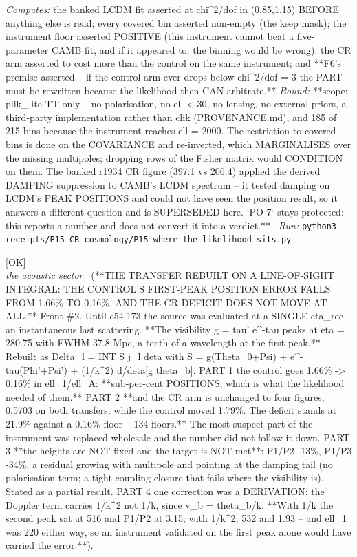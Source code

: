 \begin{description}
\emph{Computes:} the banked LCDM fit asserted at chi\textasciicircum{}2/dof in (0.85,1.15) BEFORE anything else is read; every covered bin asserted non-empty (the keep mask); the instrument floor asserted POSITIVE (this instrument cannot beat a five-parameter CAMB fit, and if it appeared to, the binning would be wrong); the CR arm asserted to cost more than the control on the same instrument; and **F6's premise asserted -- if the control arm ever drops below chi\textasciicircum{}2/dof = 3 the PART must be rewritten because the likelihood then CAN arbitrate.**
 \emph{Bound:} **scope: plik\_lite TT only -- no polarisation, no ell < 30, no lensing, no external priors, a third-party implementation rather than clik (PROVENANCE.md), and 185 of 215 bins because the instrument reaches ell = 2000. The restriction to covered bins is done on the COVARIANCE and re-inverted, which MARGINALISES over the missing multipoles; dropping rows of the Fisher matrix would CONDITION on them. The banked r1934 CR figure (397.1 vs 206.4) applied the derived DAMPING suppression to CAMB's LCDM spectrum -- it tested damping on LCDM's PEAK POSITIONS and could not have seen the position result, so it answers a different question and is SUPERSEDED here. `PO-7` stays protected: this reports a number and does not convert it into a verdict.**
\ \emph{Run:} \texttt{python3 receipts/P15\_CR\_cosmology/P15\_where\_the\_likelihood\_sits.py}
\item[\label{rcpt:P15_the_line_of_sight_transfer}\texttt{P15\_the\_line\_of\_sight\_transfer}]\hfill\textsf{[OK]}\\
\textit{the acoustic sector} \ (**THE TRANSFER REBUILT ON A LINE-OF-SIGHT INTEGRAL: THE CONTROL'S FIRST-PEAK POSITION ERROR FALLS FROM 1.66\% TO 0.16\%, AND THE CR DEFICIT DOES NOT MOVE AT ALL.** Front \#2. Until c54.173 the source was evaluated at a SINGLE eta\_rec -- an instantaneous last scattering. **The visibility g = tau' e\textasciicircum{}-tau peaks at eta = 280.75 with FWHM 37.8 Mpc, a tenth of a wavelength at the first peak.** Rebuilt as Delta\_l = INT S j\_l deta with S = g(Theta\_0+Psi) + e\textasciicircum{}-tau(Phi'+Psi') + (1/k\textasciicircum{}2) d/deta[g theta\_b]. PART 1 the control goes 1.66\% -> 0.16\% in ell\_1/ell\_A: **sub-per-cent POSITIONS, which is what the likelihood needed of them.** PART 2 **and the CR arm is unchanged to four figures, 0.5703 on both transfers, while the control moved 1.79\%. The deficit stands at 21.9\% against a 0.16\% floor -- 134 floors.** The most suspect part of the instrument was replaced wholesale and the number did not follow it down. PART 3 **the heights are NOT fixed and the target is NOT met**: P1/P2 -13\%, P1/P3 -34\%, a residual growing with multipole and pointing at the damping tail (no polarisation term; a tight-coupling closure that fails where the visibility is). Stated as a partial result. PART 4 one correction was a DERIVATION: the Doppler term carries 1/k\textasciicircum{}2 not 1/k, since v\_b = theta\_b/k. **With 1/k the second peak sat at 516 and P1/P2 at 3.15; with 1/k\textasciicircum{}2, 532 and 1.93 -- and ell\_1 was 220 either way, so an instrument validated on the first peak alone would have carried the error.**). 

\end{description}
